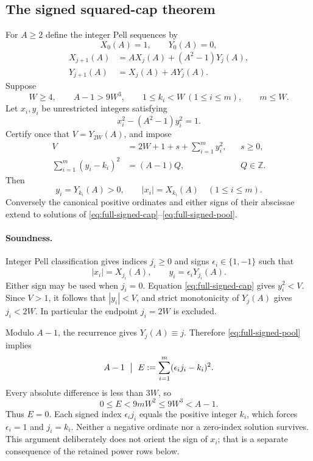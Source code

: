 \subsection{The signed squared-cap theorem}
For $A\geq2$ define the integer Pell sequences by
\[
 X_0(A)=1,\qquad Y_0(A)=0,
\]
\[
 \begin{aligned}
 X_{j+1}(A)&=A X_j(A)+(A^2-1)Y_j(A),\\
 Y_{j+1}(A)&=X_j(A)+A Y_j(A).
 \end{aligned}
\]
Suppose
\[
 W\geq4,\qquad A-1>9W^3,\qquad
 1\leq k_i<W\ (1\leq i\leq m),\qquad m\leq W.
\]
Let $x_i,y_i$ be unrestricted integers satisfying
\[
 x_i^2-(A^2-1)y_i^2=1.
\]
Certify once that $V=Y_{2W}(A)$, and impose
\begin{align}
 V&=2W+1+s+\sum_{i=1}^m y_i^2,
       &&s\geq0, \label{eq:full-signed-cap}\\
 \sum_{i=1}^m(y_i-k_i)^2&=(A-1)Q,
       &&Q\in\mathbb Z. \label{eq:full-signed-pool}
\end{align}
Then
\[
 y_i=Y_{k_i}(A)>0,\qquad |x_i|=X_{k_i}(A)
 \quad(1\leq i\leq m).
\]
Conversely the canonical positive ordinates and either signs of their
abscissae extend to solutions of
\eqref{eq:full-signed-cap}--\eqref{eq:full-signed-pool}.

\paragraph{Soundness.}
Integer Pell classification gives indices $j_i\geq0$ and signs
$\epsilon_i\in\{1,-1\}$ such that
\[
 |x_i|=X_{j_i}(A),\qquad y_i=\epsilon_iY_{j_i}(A).
\]
Either sign may be used when $j_i=0$. Equation
\eqref{eq:full-signed-cap} gives $y_i^2<V$. Since $V>1$, it follows
that $|y_i|<V$, and strict monotonicity of $Y_j(A)$ gives
$j_i<2W$. In particular the endpoint $j_i=2W$ is excluded.

Modulo $A-1$, the recurrence gives $Y_j(A)\equiv j$. Therefore
\eqref{eq:full-signed-pool} implies
\[
 A-1\ \bigm|\ E:=\sum_{i=1}^m(\epsilon_i j_i-k_i)^2.
\]
Every absolute difference is less than $3W$, so
\[
 0\leq E<9mW^2\leq9W^3<A-1.
\]
Thus $E=0$. Each signed index $\epsilon_i j_i$ equals the positive
integer $k_i$, which forces $\epsilon_i=1$ and $j_i=k_i$.
Neither a negative ordinate nor a zero-index solution survives. This
argument deliberately does not orient the sign of $x_i$; that is a
separate consequence of the retained power rows below.

